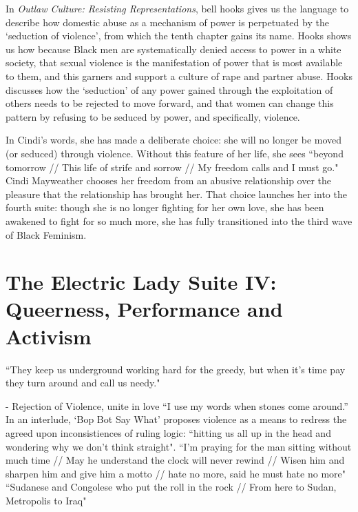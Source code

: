 \documentclass[a4paper, 11pt]{article} %
\begin{document}
In \emph{Outlaw Culture: Resisting Representations}, bell hooks gives us the language to describe how domestic abuse as a mechanism of power is perpetuated by the `seduction of violence', from which the tenth chapter gains its name\cite{hooks1994outlaw}.
Hooks shows us how because Black men are systematically denied access to power in a white society, that sexual violence is the manifestation of power that is most available to them, and this garners and support a culture of rape and partner abuse.
Hooks discusses how the `seduction' of any power gained through the exploitation of others needs to be rejected to move forward, and that women can change this pattern by refusing to be seduced by power, and specifically, violence.

In Cindi's words, she has made a deliberate choice: she will no longer be moved (or seduced) through violence. 
Without this feature of her life, she sees ``beyond tomorrow // This life of strife and sorrow // My freedom calls and I must go."\cite{babopbyeya}
Cindi Mayweather chooses her freedom from an abusive relationship over the pleasure that the relationship has brought her.
That choice launches her into the fourth suite: though she is no longer fighting for her own love, she has been awakened to fight for so much more, she has fully transitioned into the third wave of Black Feminism.


\section*{The Electric Lady Suite IV: Queerness, Performance and Activism}

``They keep us underground working hard for the greedy, but when it's time pay they turn around and call us needy."\cite{queen}

- Rejection of Violence, unite in love
``I use my words when stones come around.''\cite{manymoons}
In an interlude, `Bop Bot Say What' proposes violence as a means to redress the agreed upon inconsistiences of ruling logic: ``hitting us all up in the head and wondering why we don't think straight"\cite{chromeshoppe}.
``I'm praying for the man sitting without much time // May he understand the clock will never rewind // Wisen him and sharpen him and give him a motto // hate no more, said he must hate no more"\cite{danceordie}
``Sudanese and Congolese who put the roll in the rock // From here to Sudan, Metropolis to Iraq"\cite{danceordie}
\end{document}
